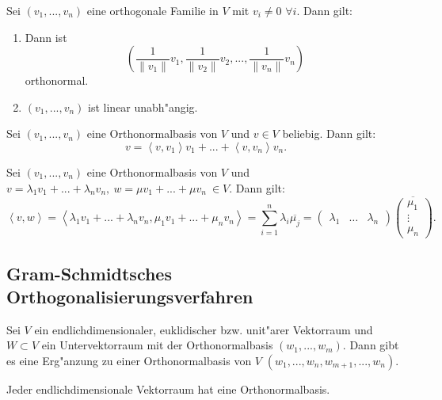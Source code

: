 \documentclass[11pt, a4paper]{article}
\begin{document}
\begin{remark}
Sei $(v_1, ..., v_n)$ eine orthogonale Familie in $V$ mit $v_i \neq 0$ $\forall i$. Dann gilt:
\begin{enumerate}
\item Dann ist 
$$
\left(\frac{1}{\|v_1\|} v_1, \frac{1}{\|v_2\|} v_2, ..., \frac{1}{\|v_n\|} v_n \right)
$$
orthonormal.
\item $(v_1, ..., v_n)$ ist linear unabh"angig.
\end{enumerate}
\end{remark}

\begin{remark}
Sei $(v_1, ..., v_n)$ eine Orthonormalbasis von $V$ und $v \in V$ beliebig. Dann gilt:
$$
v = \left\langle v, v_1 \right\rangle v_1 + ... + \left\langle v, v_n \right\rangle v_n.
$$
\end{remark}

\begin{remark}
Sei $(v_1, ..., v_n)$ eine Orthonormalbasis von $V$ und $v = \lambda_1 v_1 + ... + \lambda_n v_n, \ w =  \mu v_1 + ... + \mu v_n \  \in V$. Dann gilt:
$$
\left\langle v, w \right\rangle = \left\langle \lambda_1 v_1 + ... + \lambda_n v_n, \mu_1 v_1 + ... + \mu_n v_n \right\rangle = \sum\limits_{i = 1}^n \lambda_i \overline{\mu_j} = \left(\begin{array}{ccc}\lambda_1 & \hdots & \lambda_n \end{array} \right) \overline{\left(\begin{array}{c}\mu_1  \\ \vdots \\ \mu_n \end{array} \right)}.
$$
\end{remark}

\subsection{Gram-Schmidtsches Orthogonalisierungsverfahren}
\begin{theorem} 
Sei $V$ ein endlichdimensionaler, euklidischer bzw. unit"arer Vektorraum und $W \subset V$ ein Untervektorraum mit der Orthonormalbasis $(w_1, ..., w_m)$. Dann gibt es eine Erg"anzung zu einer Orthonormalbasis von $V$ $(w_1, ..., w_n, w_{m+1}, ..., w_n)$.
\end{theorem}

\begin{corollary}
Jeder endlichdimensionale Vektorraum hat eine Orthonormalbasis.
\end{corollary}
\end{document}
